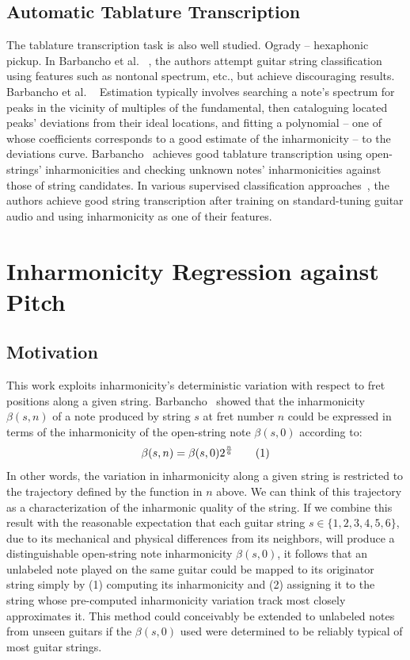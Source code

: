 \documentclass[12pt]{cmuthesis}
\newcommand\addtag{\refstepcounter{equation}\tag{\theequation}}
\begin{document}
\section{Automatic Tablature Transcription}
The tablature transcription task is also well studied. Ogrady -- hexaphonic pickup.
In Barbancho et al. ~\cite{barbancho2009}, the authors attempt guitar string classification using features such as nontonal spectrum, etc., but achieve discouraging results.
Barbancho et al. ~\cite{barbanchoi2012}
Estimation typically involves searching a note's spectrum for peaks in the vicinity of multiples of the fundamental, then cataloguing located peaks' deviations from their ideal locations, and fitting a polynomial -- one of whose coefficients corresponds to a good estimate of the inharmonicity -- to the deviations curve. Barbancho~\cite{barbanchoi2012} achieves good tablature transcription using open-strings' inharmonicities and checking unknown notes' inharmonicities against those of string candidates. In various supervised classification approaches~\cite{abesser2012, kehling2014, dittmar2013}, the authors achieve good string transcription after training on standard-tuning guitar audio and using inharmonicity as one of their features.

\noindent
\chapter{Inharmonicity Regression against Pitch}
\section{Motivation}
This work exploits inharmonicity's deterministic variation with respect to fret positions along a given string. Barbancho~\cite{barbanchoi2012} showed that the inharmonicity $\beta(s,n)$ of a note produced by string $s$ at fret number $n$ could be expressed in terms of the inharmonicity of the open-string note $\beta(s,0)$ according to:
\[
\beta(s,n) = \beta(s,0)2^{\frac{n}{6}} \addtag
\]
In other words, the variation in inharmonicity along a given string is restricted to the trajectory defined by the function in $n$ above. We can think of this trajectory as a characterization of the inharmonic quality of the string. If we combine this result with the reasonable expectation that each guitar string $s\in\{1,2,3,4,5,6\}$, due to its mechanical and physical differences from its neighbors, will produce a distinguishable open-string note inharmonicity $\beta(s,0)$, it follows that an unlabeled note played on the same guitar could be mapped to its originator string simply by (1) computing its inharmonicity and (2) assigning it to the string whose pre-computed inharmonicity variation track most closely approximates it. This method could conceivably be extended to unlabeled notes from unseen guitars if the $\beta(s,0)$ used were determined to be reliably typical of most guitar strings. 
\end{document}
